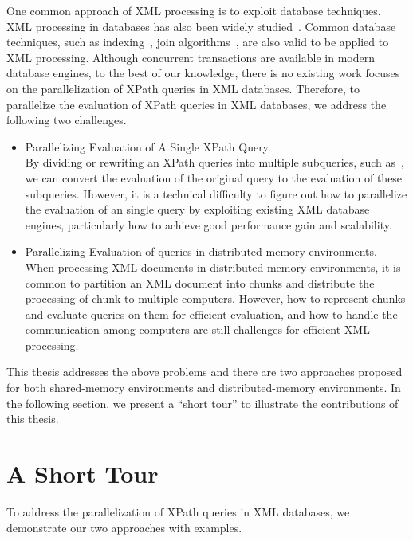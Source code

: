 One common approach of XML processing is to exploit database techniques. 
XML processing in
databases has also been widely
studied~\cite{fong2001converting,meier2002exist,jagadish2002timber,jiang2002xparent,PCSS04}.
Common database techniques, such as
indexing~\cite{kha2001xml,wang2005sequencing,popovici2005sirius}, join
algorithms~\cite{liang2005lax,liang2006slax,guha2003index}, are also valid to be
applied to XML processing. Although concurrent transactions are available in
modern database engines, to the best of our knowledge, there is no existing work
focuses on the parallelization of XPath queries in XML databases. Therefore, to
parallelize the evaluation of XPath queries in XML databases, we address the
following two challenges.

\begin{itemize}
\item Parallelizing Evaluation of A Single XPath Query. \\
By dividing or rewriting an XPath queries into multiple subqueries, such
as~\cite{BoLS09,Bord10},  we can convert the evaluation of the original query to
the evaluation of these subqueries. However, it is a technical difficulty to
figure out how to parallelize the evaluation of an single query by exploiting
existing XML database engines, particularly how to achieve good performance
gain and scalability.

\item Parallelizing Evaluation of queries in distributed-memory environments.\\
When processing XML documents in distributed-memory environments, it is common
to partition an XML document into chunks and distribute the processing of chunk
to multiple computers. However, how to represent chunks and evaluate queries on
them for efficient evaluation, and how to handle the communication among
computers are still challenges for efficient XML processing.
\end{itemize}

This thesis addresses the above problems and there are two approaches proposed
for both shared-memory environments and distributed-memory environments. In the
following section, we present a ``short tour'' to illustrate the contributions
of this thesis.

\section{A Short Tour}

To address the parallelization of XPath queries in XML databases, we demonstrate
our two approaches with examples.

